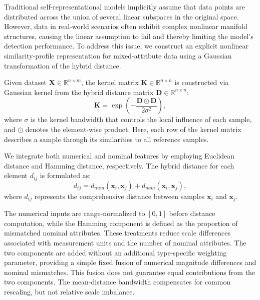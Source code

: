 \documentclass[ASNA,twocolumn]{USG} %
\begin{document}
Traditional self-representational models implicitly assume that data points are distributed across the union of several linear subspaces in the original space. However, data in real-world scenarios often exhibit complex nonlinear manifold structures, causing the linear assumption to fail and thereby limiting the model’s detection performance. To address this issue, we construct an explicit nonlinear similarity-profile representation for mixed-attribute data using a Gaussian transformation of the hybrid distance.

Given dataset $\boldsymbol{X} \in \mathbb{R}^{n \times m}$, the kernel matrix $\boldsymbol{K} \in \mathbb{R}^{n \times n}$ is constructed via Gaussian kernel from the hybrid distance matrix $\boldsymbol{D} \in \mathbb{R}^{n \times n}$:
\begin{equation}\label{kernel_matrix}
\boldsymbol{K} = \exp \left( -\frac{\boldsymbol{D} \odot \boldsymbol{D}}{2\sigma^2} \right),
\end{equation}
where $\sigma$ is the kernel bandwidth that controls the local influence of each sample, and $\odot$ denotes the element-wise product. Here, each row of the kernel matrix describes a sample through its similarities to all reference samples.

We integrate both numerical and nominal features by employing Euclidean distance and Hamming distance, respectively. The hybrid distance for each element $d_{ij}$ is formulated as:
\begin{equation}
d_{i j} = d_{num}(\boldsymbol{x}_{i}, \boldsymbol{x}_{j}) + d_{nom}(\boldsymbol{x}_{i}, \boldsymbol{x}_{j}),
\end{equation}
where $d_{ij}$ represents the comprehensive distance between samples $\boldsymbol{x}_i$ and $\boldsymbol{x}_j$.

The numerical inputs are range-normalized to $[0,1]$ before distance computation, while the Hamming component is defined as the proportion of mismatched nominal attributes. These treatments reduce scale differences associated with measurement units and the number of nominal attributes. The two components are added without an additional type-specific weighting parameter, providing a simple fixed fusion of numerical magnitude differences and nominal mismatches. This fusion does not guarantee equal contributions from the two components. The mean-distance bandwidth compensates for common rescaling, but not relative scale imbalance.
\end{document}
